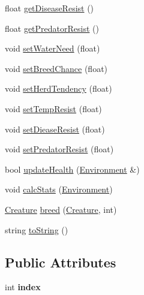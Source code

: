 \begin{DoxyCompactItemize}
float \hyperlink{class_creature_a26cacf88614142bfab05c2602088f1ba}{get\+Disease\+Resist} ()
\item 
float \hyperlink{class_creature_af18fa6015052120359c99cd56620c91e}{get\+Predator\+Resist} ()
\item 
void \hyperlink{class_creature_a61b42a4c3fe592a559ccfcef5089d676}{set\+Water\+Need} (float)
\item 
void \hyperlink{class_creature_aa0c973f2abb3cfad7c828b62baf80a33}{set\+Breed\+Chance} (float)
\item 
void \hyperlink{class_creature_ac54280109cd668ca679189c83cf9318c}{set\+Herd\+Tendency} (float)
\item 
void \hyperlink{class_creature_a7e34bf01307d2818cf51f184237a62b8}{set\+Temp\+Resist} (float)
\item 
void \hyperlink{class_creature_a76623b331f8a5051c8ab6aa122ed3091}{set\+Diease\+Resist} (float)
\item 
void \hyperlink{class_creature_a1e8c730feef5947ead25549f7b43c36c}{set\+Predator\+Resist} (float)
\item 
bool \hyperlink{class_creature_a3316556d75305448ffb28a26d7eaa0ad}{update\+Health} (\hyperlink{class_environment}{Environment} \&)
\item 
void \hyperlink{class_creature_a87624b71be563323455cb5241aba25b4}{calc\+Stats} (\hyperlink{class_environment}{Environment})
\item 
\hyperlink{class_creature}{Creature} \hyperlink{class_creature_aa3495553c53d7743c158d961827ec81f}{breed} (\hyperlink{class_creature}{Creature}, int)
\item 
string \hyperlink{class_creature_a22ba2327e33a9e8554284f485ad9cf0f}{to\+String} ()
\end{DoxyCompactItemize}
\subsection*{Public Attributes}
\begin{DoxyCompactItemize}
\item 
\mbox{\label{class_creature_adab2dc50d1556d82299c3dd3db9597f8}} 
int {\bfseries index}
\end{DoxyCompactItemize}
